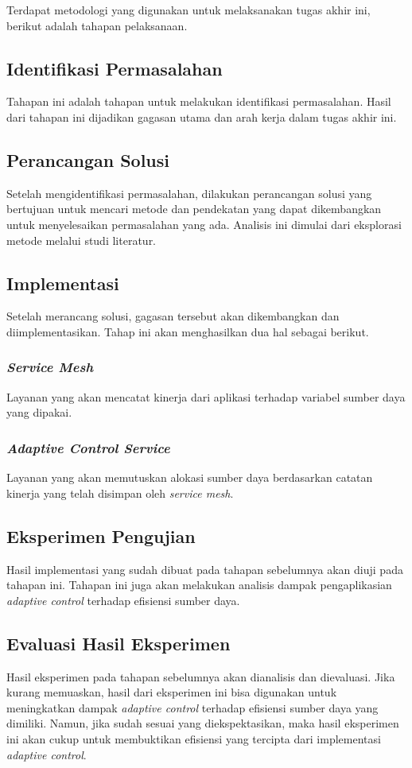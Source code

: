 Terdapat metodologi yang digunakan untuk melaksanakan tugas akhir ini, berikut adalah tahapan pelaksanaan.
\subsection{Identifikasi Permasalahan}
Tahapan ini adalah tahapan untuk melakukan identifikasi permasalahan. Hasil dari tahapan ini dijadikan gagasan utama dan arah kerja dalam tugas akhir ini.
\subsection{Perancangan Solusi}
Setelah mengidentifikasi permasalahan, dilakukan perancangan solusi yang bertujuan untuk mencari metode dan pendekatan yang dapat dikembangkan untuk menyelesaikan permasalahan yang ada. Analisis ini dimulai dari eksplorasi metode melalui studi literatur.
\subsection{Implementasi}
Setelah merancang solusi, gagasan tersebut akan dikembangkan dan diimplementasikan. Tahap ini akan menghasilkan dua hal sebagai berikut.
\subsubsection{\textit{Service Mesh}}
Layanan yang akan mencatat kinerja dari aplikasi terhadap variabel sumber daya yang dipakai.
\subsubsection{\textit{Adaptive Control Service}}
Layanan yang akan memutuskan alokasi sumber daya berdasarkan catatan kinerja yang telah disimpan oleh \textit{service mesh}.
\subsection{Eksperimen Pengujian}
Hasil implementasi yang sudah dibuat pada tahapan sebelumnya akan diuji pada tahapan ini. Tahapan ini juga akan melakukan analisis dampak pengaplikasian \textit{adaptive control} terhadap efisiensi sumber daya.
\subsection{Evaluasi Hasil Eksperimen}
Hasil eksperimen pada tahapan sebelumnya akan dianalisis dan dievaluasi. Jika kurang memuaskan, hasil dari eksperimen ini bisa digunakan untuk meningkatkan dampak \textit{adaptive control} terhadap efisiensi sumber daya yang dimiliki. Namun, jika sudah sesuai yang diekspektasikan, maka hasil eksperimen ini akan cukup untuk membuktikan efisiensi yang tercipta dari implementasi \textit{adaptive control}.

